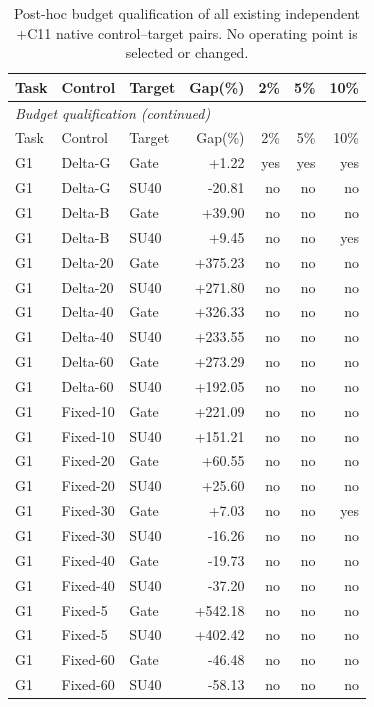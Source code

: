 \begingroup\small\setlength{\tabcolsep}{5pt}\begin{longtable}{lllrrrr}\caption{Post-hoc budget qualification of all existing independent +C11 native control--target pairs. No operating point is selected or changed.}\label{tab:sensitivity}\\\toprule Task & Control & Target & Gap(\%) & 2\% & 5\% & 10\% \\\midrule\endfirsthead\multicolumn{7}{l}{\textit{Budget qualification (continued)}}\\\toprule Task & Control & Target & Gap(\%) & 2\% & 5\% & 10\% \\\midrule\endhead
G1 & Delta-G & Gate & +1.22 & yes & yes & yes \\
G1 & Delta-G & SU40 & -20.81 & no & no & no \\
G1 & Delta-B & Gate & +39.90 & no & no & no \\
G1 & Delta-B & SU40 & +9.45 & no & no & yes \\
G1 & Delta-20 & Gate & +375.23 & no & no & no \\
G1 & Delta-20 & SU40 & +271.80 & no & no & no \\
G1 & Delta-40 & Gate & +326.33 & no & no & no \\
G1 & Delta-40 & SU40 & +233.55 & no & no & no \\
G1 & Delta-60 & Gate & +273.29 & no & no & no \\
G1 & Delta-60 & SU40 & +192.05 & no & no & no \\
G1 & Fixed-10 & Gate & +221.09 & no & no & no \\
G1 & Fixed-10 & SU40 & +151.21 & no & no & no \\
G1 & Fixed-20 & Gate & +60.55 & no & no & no \\
G1 & Fixed-20 & SU40 & +25.60 & no & no & no \\
G1 & Fixed-30 & Gate & +7.03 & no & no & yes \\
G1 & Fixed-30 & SU40 & -16.26 & no & no & no \\
G1 & Fixed-40 & Gate & -19.73 & no & no & no \\
G1 & Fixed-40 & SU40 & -37.20 & no & no & no \\
G1 & Fixed-5 & Gate & +542.18 & no & no & no \\
G1 & Fixed-5 & SU40 & +402.42 & no & no & no \\
G1 & Fixed-60 & Gate & -46.48 & no & no & no \\
G1 & Fixed-60 & SU40 & -58.13 & no & no & no \\

\end{longtable}
